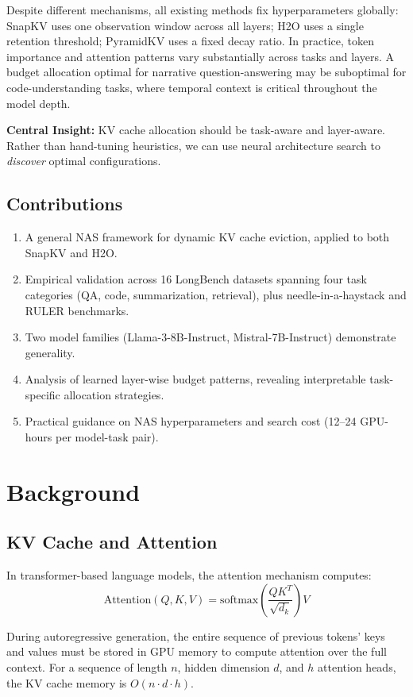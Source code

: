 \documentclass[11pt,a4paper]{article}
\begin{document}
Despite different mechanisms, all existing methods fix hyperparameters globally: SnapKV uses one observation window across all layers; H2O uses a single retention threshold; PyramidKV uses a fixed decay ratio. In practice, token importance and attention patterns vary substantially across tasks and layers. A budget allocation optimal for narrative question-answering may be suboptimal for code-understanding tasks, where temporal context is critical throughout the model depth.

\textbf{Central Insight:} KV cache allocation should be task-aware and layer-aware. Rather than hand-tuning heuristics, we can use neural architecture search to \emph{discover} optimal configurations.

\subsection{Contributions}

\begin{enumerate}
    \item A general NAS framework for dynamic KV cache eviction, applied to both SnapKV and H2O.
    \item Empirical validation across 16 LongBench datasets spanning four task categories (QA, code, summarization, retrieval), plus needle-in-a-haystack and RULER benchmarks.
    \item Two model families (Llama-3-8B-Instruct, Mistral-7B-Instruct) demonstrate generality.
    \item Analysis of learned layer-wise budget patterns, revealing interpretable task-specific allocation strategies.
    \item Practical guidance on NAS hyperparameters and search cost (12–24 GPU-hours per model-task pair).
\end{enumerate}

\section{Background}

\subsection{KV Cache and Attention}

In transformer-based language models, the attention mechanism computes:
\[
\text{Attention}(Q, K, V) = \text{softmax}\left(\frac{QK^T}{\sqrt{d_k}}\right) V
\]

During autoregressive generation, the entire sequence of previous tokens' keys and values must be stored in GPU memory to compute attention over the full context. For a sequence of length $n$, hidden dimension $d$, and $h$ attention heads, the KV cache memory is $O(n \cdot d \cdot h)$.
\end{document}
